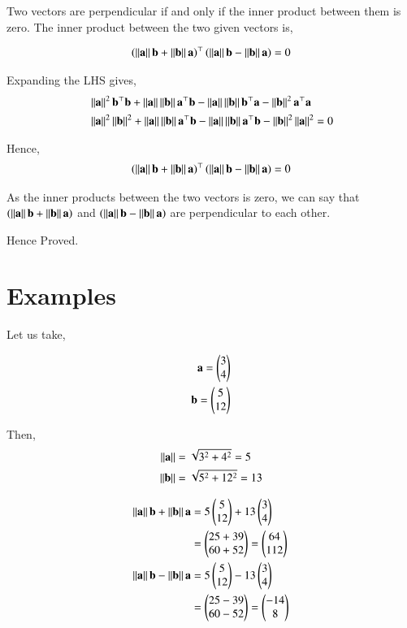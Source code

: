 \documentclass[journal,11pt,twocolumn]{IEEEtran}
\begin{document}
Two vectors are perpendicular if and only if the inner product between them is zero. The inner product between the two given vectors is,

\begin{align}
\left(\norm{\vec{a}}\vec{b}+\norm{\vec{b}}\vec{a}\right)^{\top} \left(\norm{\vec{a}}\vec{b}-\norm{\vec{b}}\vec{a}\right) = 0
\end{align}

Expanding the LHS gives,
\begin{align}
&\norm{\vec{a}}^2\vec{b}^{\top} \vec{b}+\norm{\vec{a}}\norm{\vec{b}} \vec{a}^{\top}\vec{b}-\norm{\vec{a}}\norm{\vec{b}}\vec{b}^{\top}\vec{a}-\norm{\vec{b}}^2 \vec{a}^{\top}\vec{a}\\
	&\norm{\vec{a}}^2\norm{\vec{b}}^2+\norm{\vec{a}}\norm{\vec{b}}\vec{a}^{\top}\vec{b}-\norm{\vec{a}}\norm{\vec{b}}\vec{a}^{\top}\vec{b}-\norm{\vec{b}}^2\norm{\vec{a}}^2=0
\end{align}

Hence,
\begin{align}
\left(\norm{\vec{a}}\vec{b}+\norm{\vec{b}}\vec{a}\right)^{\top} \left(\norm{\vec{a}}\vec{b}-\norm{\vec{b}}\vec{a}\right) = 0
\end{align}


As the inner products between the two vectors is zero, we can say that $ \left(\norm{\vec{a}}\vec{b}+\norm{\vec{b}}\vec{a}\right)$ and $\left(\norm{\vec{a}}\vec{b}-\norm{\vec{b}}\vec{a}\right)$ are perpendicular to each other.

Hence Proved.

\section{Examples}
Let us take, 

\begin{align}
	\vec{a} = \myvec{3 \\ 4}\\ 
	\vec{b} = \myvec{5\\ 12}
\end{align}

Then,
\begin{align}
	\norm{\vec{a}} &= \sqrt{3^2+4^2} = 5\\
	\norm{\vec{b}} &= \sqrt{5^2+12^2} = 13
\end{align}

\begin{align}
	\norm{\vec{a}}\vec{b}+\norm{\vec{b}}\vec{a} &= 5\myvec{5\\ 12} + 13\myvec{3\\ 4}\\
	&=\myvec{25+39\\ 60+52} = \myvec{64\\ 112}\\
	\norm{\vec{a}}\vec{b}-\norm{\vec{b}}\vec{a} &=  5\myvec{5\\ 12} - 13\myvec{3\\ 4}\\
	&=\myvec{25-39\\ 60-52} = \myvec{-14\\ 8}
\end{align}
\end{document}
